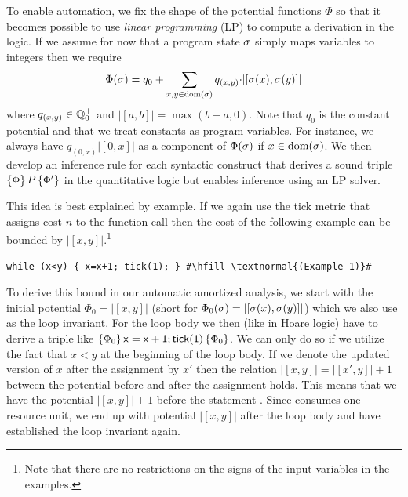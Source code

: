 \documentclass[nocopyrightspace,preprint,pldi]{sigplanconf-pldi15}
\newcommand{\iffull}[2]{\ifx\fullversion\undefined{#2}\else{#1}\fi}
\begin{document}
To enable automation, we fix the shape of the potential functions
$\Phi$ so that it becomes possible to use \emph{linear programming}
(LP) to compute a derivation in the logic.  If we assume for now that
a program state $\sigma$ simply maps variables to integers then we
require
$$
\Phi(\sigma) = q_0 + \sum_{x,y \in  \text{dom}(\sigma)} q_{(x,y)} {\cdot} |[\sigma(x),\sigma(y)]|
$$
where $q_{(x,y)} \in \mathbb Q^+_0$ and $|[a,b]| = \max(b-a,0)$.  Note that
$q_0$ is the constant potential and that we treat constants as program
variables.  For instance, we always have $q_{(0,x)}|[0,x]|$ as a
component of $\Phi(\sigma)$ if $x \in  \text{dom}(\sigma)$.
%
We then develop an inference rule for each syntactic construct that
derives a sound triple $\{\Phi\}\, P\, \{\Phi'\}$ in the quantitative
logic but enables inference using an LP solver.

This idea is best explained by example.  If we again use the
tick metric that assigns cost $n$ to the function call
\iffull{ and cost $0$ to all other operations}{} then
the cost of the following example can be bounded by $|[x,y]|$.\footnote{Note
that there are no restrictions on the signs of the input variables in
the examples.}
\begin{lstlisting}[basicstyle=\tt\small]
while (x<y) { x=x+1; tick(1); } #\hfill \textnormal{(Example 1)}#
\end{lstlisting}
To derive this bound in our automatic amortized analysis, we start
with the initial potential $\Phi_0 = |[x,y]|$ (short for
$\Phi_0(\sigma) = |[\sigma(x),\sigma(y)]|$) which we also use as the
loop invariant.  For the loop body we then (like in Hoare logic) have
to derive a triple like
$\{\Phi_0\}\, \mathsf{x=x+1;tick(1)}\, \{\Phi_0\}$.  We can
only do so if we utilize the fact that $x<y$ at the beginning of the
loop body.  %
If we denote the updated version of $x$ after the
assignment by $x'$ then the relation $|[x,y]| = |[x',y]| + 1$ between
the potential before and after the assignment  holds.
This means that we have the potential $|[x,y]| + 1$ before the
statement .  Since  consumes one resource unit,
we end up with potential $|[x,y]|$ after the loop body and have
established the loop invariant again.
\end{document}
